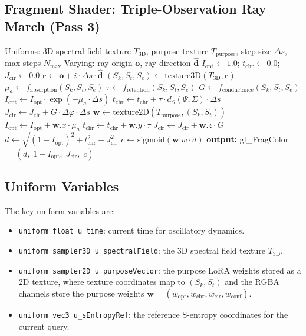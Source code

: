 \documentclass[11pt,twocolumn,a4paper]{article}
\theoremstyle{definition}
\theoremstyle{remark}
\newcommand{\Sk}{S_{k}}
\newcommand{\St}{S_{t}}
\newcommand{\Se}{S_{e}}
\newcommand{\Iopt}{I_{\mathrm{opt}}}
\newcommand{\tchr}{t_{\mathrm{chr}}}
\newcommand{\Jcir}{J_{\mathrm{cir}}}
\begin{document}
\subsection{Fragment Shader: Triple-Observation Ray March (Pass 3)}

\begin{algorithm}[H]
\caption{Fragment Shader: Triple-Observation Ray March}\label{alg:fragment-shader}
\begin{algorithmic}[1]
\Require Uniforms: 3D spectral field texture $T_{\mathrm{3D}}$, purpose texture $T_{\mathrm{purpose}}$, step size $\Delta s$, max steps $N_{\mathrm{max}}$
\Require Varying: ray origin $\mathbf{o}$, ray direction $\hat{\mathbf{d}}$
\State $\Iopt \gets 1.0$; $\tchr \gets 0.0$; $\Jcir \gets 0.0$
    \State $\mathbf{r} \gets \mathbf{o} + i \cdot \Delta s \cdot \hat{\mathbf{d}}$
    \State $(\Sk, \St, \Se) \gets \mathrm{texture3D}(T_{\mathrm{3D}}, \mathbf{r})$
    \State $\mu_a \gets f_{\mathrm{absorption}}(\Sk, \St, \Se)$ 
    \State $\tau \gets f_{\mathrm{retention}}(\Sk, \St, \Se)$ 
    \State $G \gets f_{\mathrm{conductance}}(\Sk, \St, \Se)$ 
    \State $\Iopt \gets \Iopt \cdot \exp(-\mu_a \cdot \Delta s)$
    \State $\tchr \gets \tchr + \tau \cdot d_S(\Psi, \Sigma) \cdot \Delta s$
    \State $\Jcir \gets \Jcir + G \cdot \Delta\varphi \cdot \Delta s$
    \State {}
    \State $\mathbf{w} \gets \mathrm{texture2D}(T_{\mathrm{purpose}}, (\Sk, \St))$
    \State $\Iopt \gets \Iopt + \mathbf{w}.x \cdot \mu_a$
    \State $\tchr \gets \tchr + \mathbf{w}.y \cdot \tau$
    \State $\Jcir \gets \Jcir + \mathbf{w}.z \cdot G$
\EndFor
\State $d \gets \sqrt{(1 - \Iopt)^2 + \tchr^2 + \Jcir^2}$ 
\State $c \gets \mathrm{sigmoid}(\mathbf{w}.w \cdot d)$ 
\State \textbf{output:} gl\_FragColor $= (d, \; 1 - \Iopt, \; \Jcir, \; c)$
\end{algorithmic}
\end{algorithm}

\subsection{Uniform Variables}

The key uniform variables are:
\begin{itemize}
    \item \texttt{uniform float u\_time}: current time for oscillatory dynamics.
    \item \texttt{uniform sampler3D u\_spectralField}: the 3D spectral field texture $T_{\mathrm{3D}}$.
    \item \texttt{uniform sampler2D u\_purposeVector}: the purpose LoRA weights stored as a 2D texture, where texture coordinates map to $(\Sk, \St)$ and the RGBA channels store the purpose weights $\mathbf{w} = (w_{\mathrm{opt}}, w_{\mathrm{chr}}, w_{\mathrm{cir}}, w_{\mathrm{conf}})$.
    \item \texttt{uniform vec3 u\_sEntropyRef}: the reference S-entropy coordinates for the current query.
\end{itemize}
\end{document}
